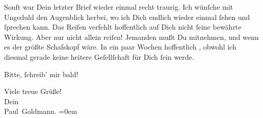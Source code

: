 \pstart
           Sonſt war Dein letzter Brief  wieder einmal recht
               traurig. Ich wünſche mit Ungeduld den Augenblick herbei, wo ich Dich endlich wieder
               einmal ſehen und{ }ſprechen kann. Das Reiſen verfehlt hoffentlich auf Dich nicht{ }ſeine
               bewährte Wirkung. Aber nur nicht allein reiſen! Jemanden mußt Du mitnehmen, und wenn
               es der größte Schafskopf wäre. In ein paar Wochen hoffentlich \label{K_L02878-4v}\label{K_L02878-4},
                  \strikeout{\textcolor{gray}{×}\-\textcolor{gray}{×}} obwohl ich diesmal gerade keine heitere Geſellſchaft für Dich{ }ſein werde.\pend
           
\pstart
           Bitte,{ }ſchreib’ mir bald!\pend
           
\pstart
           Viele treue Grüße! {\\[\baselineskip]}Dein {\\[\baselineskip]}\spacefill\mbox{Paul Goldmann.}\pend
           \leftskip=0em{}\endnumbering{}  \newcommand{\dateiname}{L02878}\newcommand{\titel}{Paul Goldmann an Arthur Schnitzler, 2. 7. 1899}\newcommand{\editorInnen}{Martin Anton Müller und Laura Untner}
